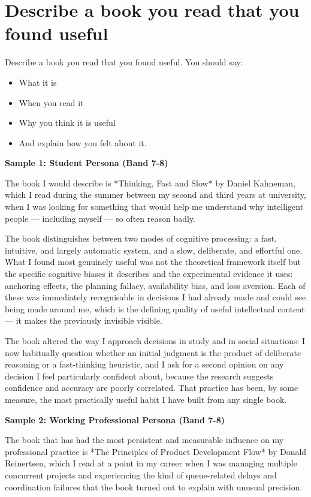 \section{Describe a book you read that you found useful}
\begin{ieltsprompt}
Describe a book you read that you found useful.
You should say:
\begin{itemize}[leftmargin=2em, itemsep=2pt]
\item What it is
\item When you read it
\item Why you think it is useful
\item And explain how you felt about it.
\end{itemize}
\end{ieltsprompt}
\begin{ieltsanswer}
\textbf{Sample 1: Student Persona (Band 7-8)}

The book I would describe is *Thinking, Fast and Slow* by Daniel Kahneman, which I read during the summer between my second and third years at university, when I was looking for something that would help me understand why intelligent people — including myself — so often reason badly.

The book distinguishes between two modes of cognitive processing: a fast, intuitive, and largely automatic system, and a slow, deliberate, and effortful one. What I found most genuinely useful was not the theoretical framework itself but the specific cognitive biases it describes and the experimental evidence it uses: anchoring effects, the planning fallacy, availability bias, and loss aversion. Each of these was immediately recognisable in decisions I had already made and could see being made around me, which is the defining quality of useful intellectual content — it makes the previously invisible visible.

The book altered the way I approach decisions in study and in social situations: I now habitually question whether an initial judgment is the product of deliberate reasoning or a fast-thinking heuristic, and I ask for a second opinion on any decision I feel particularly confident about, because the research suggests confidence and accuracy are poorly correlated. That practice has been, by some measure, the most practically useful habit I have built from any single book.

\textbf{Sample 2: Working Professional Persona (Band 7-8)}

The book that has had the most persistent and measurable influence on my professional practice is *The Principles of Product Development Flow* by Donald Reinertsen, which I read at a point in my career when I was managing multiple concurrent projects and experiencing the kind of queue-related delays and coordination failures that the book turned out to explain with unusual precision.


\end{ieltsanswer}
